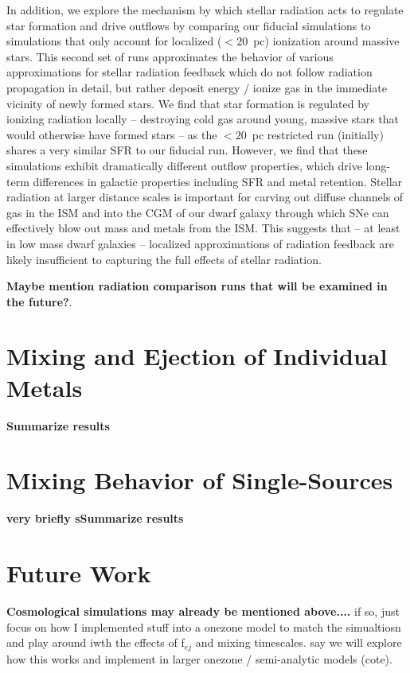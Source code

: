 In addition, we explore the mechanism by which stellar radiation acts to regulate star formation and drive outflows by comparing our fiducial simulations to simulations that only account for localized ($< 20$~pc) ionization around massive stars. This second set of runs approximates the behavior of various approximations for stellar radiation feedback which do not follow radiation propagation in detail, but rather deposit energy / ionize gas in the immediate vicinity of newly formed stars. We find that star formation is regulated by ionizing radiation locally -- destroying cold gas around young, massive stars that would otherwise have formed stars -- as the $< 20$~pc restricted run (initially) shares a very similar SFR to our fiducial run. However, we find that these simulations exhibit dramatically different outflow properties, which drive long-term differences in galactic properties including SFR and metal retention. Stellar radiation at larger distance scales is important for carving out diffuse channels of gas in the ISM and into the CGM of our dwarf galaxy through which SNe can effectively blow out mass and metals from the ISM. This suggests that -- at least in low mass dwarf galaxies -- localized approximations of radiation feedback are likely insufficient to capturing the full effects of stellar radiation.

\textbf{Maybe mention radiation comparison runs that will be examined in the future?}.


\section{Mixing and Ejection of Individual Metals}

\textbf{Summarize results}

\section{Mixing Behavior of Single-Sources}

\textbf{very briefly sSummarize results}


\section{Future Work}

\textbf{Cosmological simulations may already be mentioned above....} if so, just focus on how I implemented stuff into a onezone model to match the simualtiosn and play around iwth the effects of f$_{ej}$ and mixing timescales. say we will explore how this works and implement in larger onezone / semi-analytic models (cote). 
